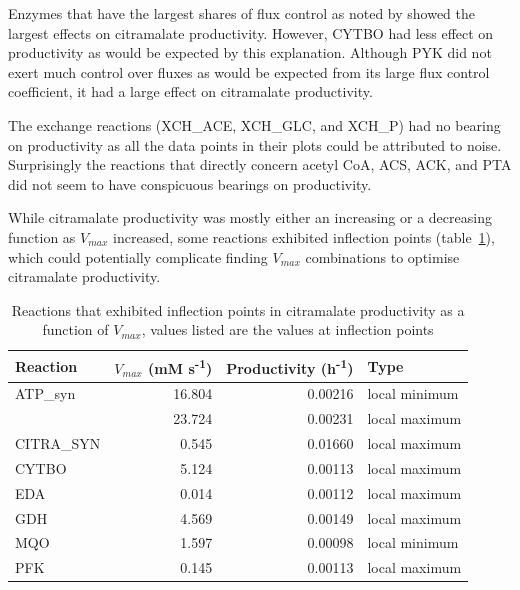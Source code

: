 \documentclass[parskip=full, numbers=noenddot]{scrreprt}
\begin{document}
Enzymes that have the largest shares of flux control as noted by \citet{millard_metabolic_2017} showed the largest effects on citramalate productivity. However, CYTBO had less effect on productivity as would be expected by this explanation. Although PYK did not exert much control over fluxes as would be expected from its large flux control coefficient, it had a large effect on citramalate productivity. %

The exchange reactions (XCH\_ACE, XCH\_GLC, and XCH\_P) had no bearing on productivity as all the data points in their plots could be attributed to noise. Surprisingly the reactions that directly concern acetyl CoA, ACS, ACK, and PTA did not seem to have conspicuous bearings on productivity.

While citramalate productivity was mostly either an increasing or a decreasing function as $V_{max}$ increased, some reactions exhibited inflection points (table~\ref{tab:inflection}), which could potentially complicate finding $V_{max}$ combinations to optimise citramalate productivity.

\begin{table}[h]
  \caption{Reactions that exhibited inflection points in citramalate productivity as a function of $V_{max}$, values listed are the values at inflection points}
  \label{tab:inflection}
  \centering
  \begin{tabular}{lrrl}
    \toprule
    Reaction & $V_{max}$ (mM s\textsuperscript{-1}) & Productivity (h\textsuperscript{-1}) & Type\\
    \midrule
    ATP\_syn & 16.804 & 0.00216 & local minimum\\
    & 23.724 & 0.00231 & local maximum\\
    CITRA\_SYN & 0.545 & 0.01660 & local maximum\\
    CYTBO & 5.124 & 0.00113 & local maximum\\
    EDA & 0.014 & 0.00112 & local maximum\\
    GDH & 4.569 & 0.00149 & local maximum\\
    MQO & 1.597 & 0.00098 & local minimum\\
    PFK & 0.145 & 0.00113 & local maximum\\
    \bottomrule
  \end{tabular}
\end{table}
\end{document}
